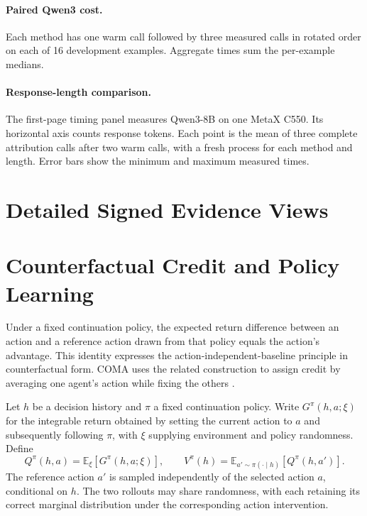 \paragraph{Paired Qwen3 cost.}
Each method has one warm call followed by three measured calls in rotated order on each of 16 development examples. Aggregate times sum the per-example medians.

\paragraph{Response-length comparison.}
The first-page timing panel measures Qwen3-8B on one MetaX C550. Its horizontal axis counts response tokens. Each point is the mean of three complete attribution calls after two warm calls, with a fresh process for each method and length. Error bars show the minimum and maximum measured times.

\clearpage
\section{Detailed Signed Evidence Views}


\clearpage
\section{Counterfactual Credit and Policy Learning}
\label{app:credit}

Under a fixed continuation policy, the expected return difference between an action and a reference action drawn from that policy equals the action's advantage. This identity expresses the action-independent-baseline principle \citep{sutton1999policy} in counterfactual form. COMA uses the related construction to assign credit by averaging one agent's action while fixing the others \citep{foerster2018counterfactual}.

Let $h$ be a decision history and $\pi$ a fixed continuation policy. Write $G^\pi(h,a;\xi)$ for the integrable return obtained by setting the current action to $a$ and subsequently following $\pi$, with $\xi$ supplying environment and policy randomness. Define
\begin{equation}
Q^\pi(h,a)=\mathbb E_\xi[G^\pi(h,a;\xi)],\qquad
V^\pi(h)=\mathbb E_{a'\sim\pi(\cdot\mid h)}[Q^\pi(h,a')].
\end{equation}
The reference action $a'$ is sampled independently of the selected action $a$, conditional on $h$. The two rollouts may share randomness, with each retaining its correct marginal distribution under the corresponding action intervention.


